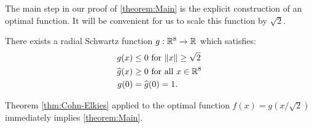 The main step in our proof of \cref{theorem:Main} is the explicit construction of an optimal function. It will be convenient for us to scale this function by $\sqrt{2}$.
\begin{theorem}\label{thm:g}
There exists a radial Schwartz function $g:\mathbb{R}^8\to\mathbb{R}$ which satisfies:
\begin{align}
g(x)&\leq 0\mbox{ for } \|x\|\geq \sqrt{2} \label{eqn:g1}\\
\widehat{g}(x)&\geq0\mbox{ for all } x\in\mathbb{R}^8\label{eqn:g2}\\
g(0)&=\widehat{g}(0)=1.\label{eqn:g3}
\end{align}
\end{theorem}
Theorem \ref{thm:Cohn-Elkies} applied to the optimal function $f(x)=g(x/\sqrt{2})$ immediately implies \cref{theorem:Main}.
